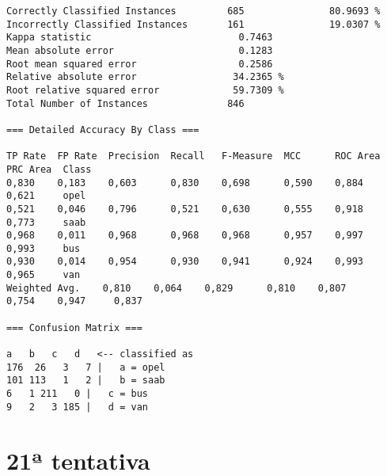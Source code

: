 \documentclass[
	article,			%
	11pt,				%
	oneside,			%
	a4paper,			%
	english,			%
	brazil,				%
	sumario=tradicional
	]{abntex2}
\begin{document}
\begin{lstlisting}
Correctly Classified Instances         685               80.9693 %
Incorrectly Classified Instances       161               19.0307 %
Kappa statistic                          0.7463
Mean absolute error                      0.1283
Root mean squared error                  0.2586
Relative absolute error                 34.2365 %
Root relative squared error             59.7309 %
Total Number of Instances              846     

=== Detailed Accuracy By Class ===

TP Rate  FP Rate  Precision  Recall   F-Measure  MCC      ROC Area  PRC Area  Class
0,830    0,183    0,603      0,830    0,698      0,590    0,884     0,621     opel
0,521    0,046    0,796      0,521    0,630      0,555    0,918     0,773     saab
0,968    0,011    0,968      0,968    0,968      0,957    0,997     0,993     bus
0,930    0,014    0,954      0,930    0,941      0,924    0,993     0,965     van
Weighted Avg.    0,810    0,064    0,829      0,810    0,807      0,754    0,947     0,837     

=== Confusion Matrix ===

a   b   c   d   <-- classified as
176  26   3   7 |   a = opel
101 113   1   2 |   b = saab
6   1 211   0 |   c = bus
9   2   3 185 |   d = van

\end{lstlisting}

\newpage

\section{21ª tentativa}
\end{document}
